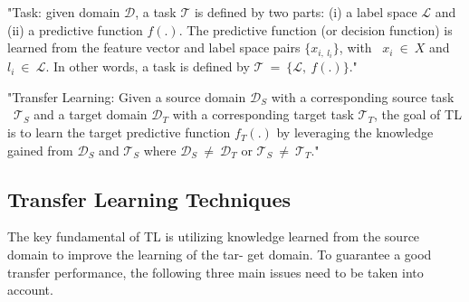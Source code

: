 \documentclass[letterpaper%
, oneside%
, 12pt%
,thesepararticles%
, english%
,creativecommons,hyperref, withAlgo2e%
]{thETS}
\begin{document}
\begin{definition}
"Task: given domain $\displaystyle \mathcal{D}$, a task $\displaystyle \mathcal{T}$ is defined by two parts: (i) a label space $\displaystyle \mathcal{L}$ and (ii) a predictive function $\displaystyle f( .)$. The predictive function (or decision function) is learned from the feature vector and label space pairs $\displaystyle \{x_{i,\ l_{i}}\}$, with \ $\displaystyle x_{i} \ \in \ X$ and $\displaystyle l_{i} \ \in \ \mathcal{L}$. In other words, a task is defined by $\displaystyle \mathcal{T} \ =\ \{\mathcal{L} ,\ f( .)\}$."
\end{definition}

\begin{definition}
"Transfer Learning: Given a source domain $\displaystyle \mathcal{D}_{S}$ with a corresponding source task \ $\displaystyle \mathcal{T}_{S}$ and a target domain $\displaystyle \mathcal{D}_{T}$ with a corresponding target task $\displaystyle \mathcal{T}_{T}$, the goal of TL is to learn the target predictive function $\displaystyle f_{T}( .)$ by leveraging the knowledge gained from $\displaystyle \mathcal{D}_{S}$ and $\displaystyle \mathcal{T}_{S}$ where $\displaystyle \mathcal{D}_{S} \ \neq \ \mathcal{D}_{T}$ or $\displaystyle \mathcal{T}_{S} \ \neq \ \mathcal{T}_{T}$."
\end{definition}

\subsection{Transfer Learning Techniques}

The key fundamental of TL is utilizing knowledge learned from the source domain to improve the learning of the tar- get domain. To guarantee a good transfer performance, the following three main issues need to be taken into account.
\end{document}
